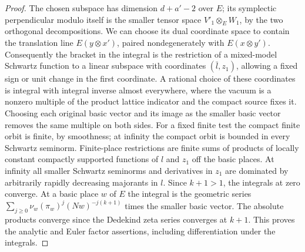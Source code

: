 \begin{proof}
The chosen subspace has dimension \(d+a'-2\) over \(E\);
its symplectic perpendicular modulo itself is the smaller tensor
space \(V'_1\otimes_EW_1\), by the two orthogonal decompositions.
We can choose its dual coordinate space to contain the translation
line \(E(y\otimes x')\), paired nondegenerately with
\(E(x\otimes y')\). Consequently the bracket in the integral is the
restriction of a mixed-model Schwartz function to a linear subspace
with coordinates \((\bar l,z_1)\), allowing a fixed sign or unit
change in the first coordinate. A rational choice of these
coordinates is integral with integral inverse almost everywhere,
where the vacuum is a nonzero multiple of the product lattice
indicator and the compact source fixes it. Choosing each original
basic vector and its image as the smaller basic vector removes the
same multiple on both sides. For a fixed finite test the compact
finite orbit is finite, by smoothness; at infinity the compact
orbit is bounded in every Schwartz seminorm. Finite-place restrictions
are finite sums of products of locally constant compactly supported
functions of \(l\) and \(z_1\) off the basic places. At infinity
all smaller Schwartz seminorms and derivatives in \(z_1\) are
dominated by arbitrarily rapidly decreasing majorants in \(l\).
Since \(k+1>1\), the integrals at zero converge. At a basic place
\(w\) of \(E\) the integral is the geometric series
\(\sum_{j\ge0}\nu_w(\pi_w)^j(Nw)^{-j(k+1)}\) times the smaller
basic vector. The absolute products converge since the Dedekind
zeta series converges at \(k+1\). This proves the analytic and Euler
factor assertions, including differentiation under the integrals.


\end{proof}
